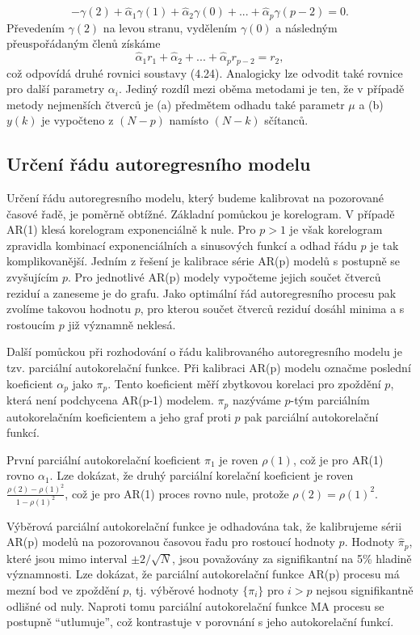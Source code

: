 \begin{equation}
-\gamma(2) + \hat{\alpha}_1 \gamma(1) + \hat{\alpha}_2 \gamma(0) + ... + \hat{\alpha}_p \gamma(p-2) = 0.
\end{equation}
Převedením $\gamma(2)$ na levou stranu, vydělením $\gamma(0)$ a následným přeuspořádaným členů získáme
\begin{equation}
\hat{\alpha}_1 r_1 + \hat{\alpha}_2 + ... + \hat{\alpha}_p r_{p-2} = r_2,
\end{equation}
což odpovídá druhé rovnici soustavy (4.24). Analogicky lze odvodit také rovnice pro další parametry $\alpha_i$. Jediný rozdíl mezi oběma metodami je ten, že v případě metody nejmenších čtverců je (a) předmětem odhadu také parametr $\mu$ a (b) $y(k)$ je vypočteno z $(N - p)$ namísto $(N - k)$ sčítanců.

\subsection{Určení řádu autoregresního modelu}

Určení řádu autoregresního modelu, který budeme kalibrovat na pozorované časové řadě, je poměrně obtížné. Základní pomůckou je korelogram. V případě AR(1) klesá korelogram exponenciálně k nule. Pro $p > 1$ je však korelogram zpravidla kombinací exponenciálních a sinusových funkcí a odhad řádu $p$ je tak komplikovanější. Jedním z řešení je kalibrace série AR(p) modelů s postupně se zvyšujícím $p$. Pro jednotlivé AR(p) modely vypočteme jejich součet čtverců reziduí a zaneseme je do grafu. Jako optimální řád autoregresního procesu pak zvolíme takovou hodnotu $p$, pro kterou součet čtverců reziduí dosáhl minima a s rostoucím $p$ již významně neklesá.

Další pomůckou při rozhodování o řádu kalibrovaného autoregresního modelu je tzv. parciální autokorelační funkce. Při kalibraci AR(p) modelu označme poslední koeficient $\alpha_p$ jako $\pi_p$. Tento koeficient měří zbytkovou korelaci pro zpoždění $p$, která není podchycena AR(p-1) modelem. $\pi_p$ nazýváme $p$-tým parciálním autokorelačním koeficientem a jeho graf proti $p$ pak parciální autokorelační funkcí.

První parciální autokorelační koeficient $\pi_1$ je roven $\rho(1)$, což je pro AR(1) rovno $\alpha_1$. Lze dokázat, že druhý parciální korelační koeficient je roven $\frac{\rho(2) - \rho(1)^2}{1 - \rho(1)^2}$, což je pro AR(1) proces rovno nule, protože $\rho(2) = \rho(1)^2$.

Výběrová parciální autokorelační funkce je odhadována tak, že kalibrujeme sérii AR(p) modelů na pozorovanou časovou řadu pro rostoucí hodnoty $p$. Hodnoty $\hat{\pi}_p$, které jsou mimo interval $\pm 2 / \sqrt{N}$, jsou považovány za signifikantní na 5\% hladině významnosti. Lze dokázat, že parciální autokorelační funkce AR(p) procesu má mezní bod ve zpoždění $p$, tj. výběrové hodnoty $\{\pi_i\}$ pro $i > p$ nejsou signifikantně odlišné od nuly. Naproti tomu parciální autokorelační funkce MA procesu se postupně ``utlumuje'', což kontrastuje v porovnání s jeho autokorelační funkcí.

